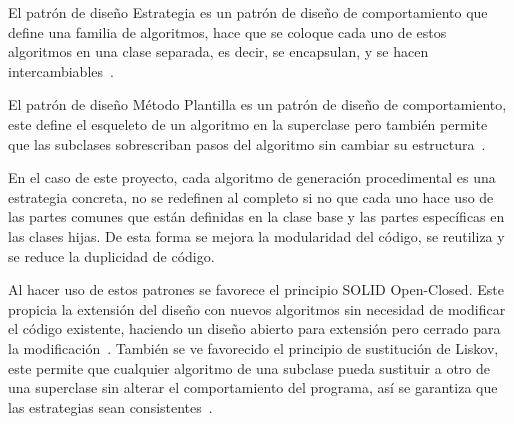 El patrón de diseño Estrategia es un patrón de diseño de comportamiento que define una familia de algoritmos, hace que se coloque cada uno de estos algoritmos en una clase separada, es decir, se encapsulan, y se hacen intercambiables~\cite{strategyPattern}. 

El patrón de diseño Método Plantilla es un patrón de diseño de comportamiento, este define el esqueleto de un algoritmo en la superclase pero también permite que las subclases sobrescriban pasos del algoritmo sin cambiar su estructura~\cite{templateMethodPattern}.

En el caso de este proyecto, cada algoritmo de generación procedimental es una estrategia concreta, no se redefinen al completo si no que cada uno hace uso de las partes comunes que están definidas en la clase base y las partes específicas en las clases hijas. De esta forma se mejora la modularidad del código, se reutiliza y se reduce la duplicidad de código. 

Al hacer uso de estos patrones se favorece el principio SOLID Open-Closed. Este propicia la extensión del diseño con nuevos algoritmos sin necesidad de modificar el código existente, haciendo un diseño abierto para extensión pero cerrado para la modificación~\cite{solidOpenClosed}. También se ve favorecido el principio de sustitución de Liskov, este permite que cualquier algoritmo de una subclase pueda sustituir a otro de una superclase sin alterar el comportamiento del programa, así se garantiza que las estrategias sean consistentes~\cite{liskovSubstitutionPrinciple}.
